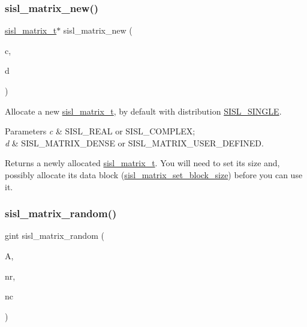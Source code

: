 \subsubsection{\texorpdfstring{sisl\+\_\+matrix\+\_\+new()}{sisl\_matrix\_new()}}
{\footnotesize\ttfamily \mbox{\hyperlink{group__matrix_gad147923587b355644defb9bfbf981740}{sisl\+\_\+matrix\+\_\+t}}$\ast$ sisl\+\_\+matrix\+\_\+new (\begin{DoxyParamCaption}\item[{\mbox{\hyperlink{group__vector_gadbf341f8965fc86dda28912ab5f04930}{sisl\+\_\+complex\+\_\+t}}}]{c,  }\item[{\mbox{\hyperlink{group__matrix_gae50d4f05ed96de495bdd326c201c28ff}{sisl\+\_\+matrix\+\_\+density\+\_\+t}}}]{d }\end{DoxyParamCaption})}

Allocate a new \mbox{\hyperlink{group__matrix_gad147923587b355644defb9bfbf981740}{sisl\+\_\+matrix\+\_\+t}}, by default with distribution \mbox{\hyperlink{group__matrix_gga03fd8bd724705cd998bb37b51393c0d4a2c7ad8cda72338a63fc48b67ba475e91}{S\+I\+S\+L\+\_\+\+S\+I\+N\+G\+LE}}.


\begin{DoxyParams}{Parameters}
{\em c} & S\+I\+S\+L\+\_\+\+R\+E\+AL or S\+I\+S\+L\+\_\+\+C\+O\+M\+P\+L\+EX; \\
\hline
{\em d} & S\+I\+S\+L\+\_\+\+M\+A\+T\+R\+I\+X\+\_\+\+D\+E\+N\+SE or S\+I\+S\+L\+\_\+\+M\+A\+T\+R\+I\+X\+\_\+\+U\+S\+E\+R\+\_\+\+D\+E\+F\+I\+N\+ED.\\
\hline
\end{DoxyParams}
\begin{DoxyReturn}{Returns}
a newly allocated \mbox{\hyperlink{group__matrix_gad147923587b355644defb9bfbf981740}{sisl\+\_\+matrix\+\_\+t}}. You will need to set its size and, possibly allocate its data block (\mbox{\hyperlink{group__matrix_ga4dbf57c7f1ff8a417425b978b85ceefc}{sisl\+\_\+matrix\+\_\+set\+\_\+block\+\_\+size}}) before you can use it. 
\end{DoxyReturn}
\mbox{\label{group__matrix_ga19e36308f5f1faa18e4351aa8c8fc8ca}} 
\subsubsection{\texorpdfstring{sisl\+\_\+matrix\+\_\+random()}{sisl\_matrix\_random()}}
{\footnotesize\ttfamily gint sisl\+\_\+matrix\+\_\+random (\begin{DoxyParamCaption}\item[{\mbox{\hyperlink{group__matrix_gad147923587b355644defb9bfbf981740}{sisl\+\_\+matrix\+\_\+t}} $\ast$}]{A,  }\item[{gint}]{nr,  }\item[{gint}]{nc }\end{DoxyParamCaption})}

